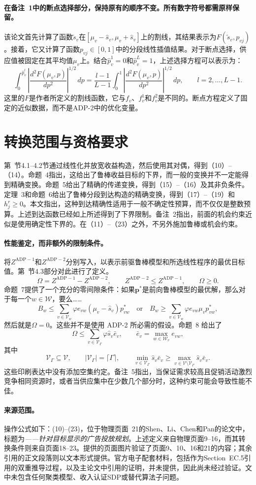 \documentclass{article}
\begin{document}
\paragraph{在备注~1中的断点选择部分，保持原有的顺序不变。所有数字符号都需原样保留。}
该论文首先计算了函数$\tilde s_v$在$[\mu_v-\hat s_v,\mu_v+\hat s_v]$上的割线，其结果表示为$F(\tilde s_v,p_{vj})$。接着，它又计算了函数$p_{vj}\in[0,1]$中的分段线性插值结果。对于断点选择，供应值被固定在其平均值$\mu_v$上。结合$\hat p^1_v=0$和$\hat p^L_v=1$，上述选择方程可以表示为：
\[
\int_0^{\hat p^l_v}\left|\frac{d^2F(\mu_v,p)}{dp^2}\right|^{1/2}\,dp
=\frac{l-1}{L-1}\int_0^1\left|\frac{d^2F(\mu_v,p)}{dp^2}\right|^{1/2}\,dp,
\qquad l=2,\ldots,L-1.
\]
这里的$F$是作者所定义的割线函数，它与$f_v$、$f^1_v$和$f^2_v$是不同的。断点方程定义了固定的近似数据，而不是ADP-2中的优化变量。

\section*{转换范围与资格要求}
第~节4.1--4.2节通过线性化并放宽收益构造，然后使用其对偶，得到（10）--（14）。命题~4指出，这给出了鲁棒收益目标的下界，而一般的变换并不一定能得到精确变换。命题~5给出了精确的传递变换，得到（15）--（16）及其非负条件。定理~3和命题~6给出了鲁棒分段到达构造的精确变换，得到（17）--（19）和$h^r_j\geq0$。本文指出，这种到达精确性适用于一般不确定性预算，而不仅仅是整数预算。上述到达函数已经如上所述得到了下界限制。备注~2指出，前面的机会约束近似是使用确定性下界的。在（11）--（23）之外，不另外施加鲁棒或机会约束。

\paragraph{性能鉴定，而非额外的限制条件。}
将$Z^{\mathrm{ADP}-1}$和$Z^{\mathrm{ADP}-2}$分别写入，以表示前驱鲁棒模型和所选线性程序的最优目标值。第~节4.3部分对此进行了定义。
\[
\Omega=Z^{\mathrm{ADP}-1}-Z^{\mathrm{ADP}-2},\qquad
Z^{\mathrm{ADP}-2}\leq Z^{\mathrm{ADP}-1},\qquad\Omega\geq0.
\]
命题~7提供了一个充分的零间隙条件：如果$\boldsymbol p^*$是前向鲁棒模型的最优解，那么对于每一个$w\in\mathcal W$，要么……
\[
B_w\leq\sum_{v\in\mathcal V_w}\varphi e_{vw}(\mu_v-\hat s_v)p^*_{vw}
\quad\text{or}\quad
B_w\geq\sum_{v\in\mathcal V_w}\varphi e_{vw}\mu_vp^*_{vw},
\]
然后就是$\Omega=0$。这些并不是使用 ADP-2 所必需的假设。命题~8 给出了
\[
\Omega\leq\sum_{v\in\mathcal V_\Gamma}\varphi\hat s_v\bar e_v,
\qquad
\bar e_v=\max_{w\in\mathcal W_v}e_{vw},
\]
其中
\[
\mathcal V_\Gamma\subseteq\mathcal V,\qquad
|\mathcal V_\Gamma|=\lceil\Gamma\rceil,\qquad
\min_{v\in\mathcal V_\Gamma}\hat s_v\bar e_v
\geq\max_{v\in\mathcal V\setminus\mathcal V_\Gamma}\hat s_v\bar e_v.
\]
这些印刷表达中没有添加空集约定。备注~5指出，当保证需求较高且促销活动激烈竞争相同资源时，或者当供应集中在少数几个部分时，这种约束可能会导致性能不佳。

\paragraph{来源范围。}
操作公式如下：(10)--(23)，位于物理页面~21的Shen、Li、Chen和Pan的论文中，标题为\emph{——针对目标显示的广告投放规划}。上述定义来自物理页面9–16，而其转换条件则来自页面18–23。提供的页面图片验证了页面9、10、16和21的内容；其余引用的正文段落则以文本形式提供。官方电子配套材料，包括作为Section~EC.5引用的双重推导过程，以及主论文中引用的证明，并未提供，因此尚未经过验证。文中未包含任何聚类模型、收入认证SDP或替代算法子问题。
\end{document}
